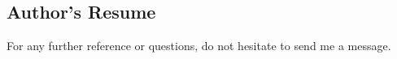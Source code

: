 \documentclass{article}
\begin{document}
\subsection{Author's Resume}
\label{sec:cv}

\centering
{}
\vfill
For any further reference or questions, do not hesitate to send me a message.

\clearpage


\end{document}
